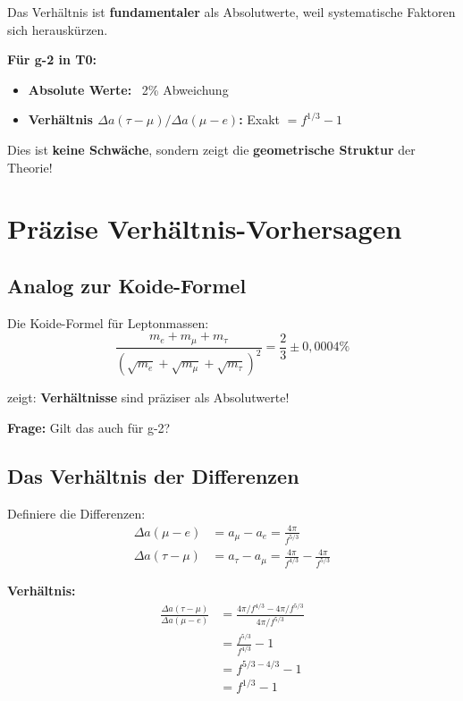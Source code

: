 	Das Verhältnis ist \textbf{fundamentaler} als Absolutwerte, weil systematische Faktoren sich herauskürzen.
	
	\textbf{Für g-2 in T0:}
	\begin{itemize}
		\item \textbf{Absolute Werte:} ~2\% Abweichung
		\item \textbf{Verhältnis $\Delta a(\tau-\mu)/\Delta a(\mu-e)$:} Exakt $= f^{1/3} - 1$
	\end{itemize}
	
	Dies ist \textbf{keine Schwäche}, sondern zeigt die \textbf{geometrische Struktur} der Theorie!	
	\section{Präzise Verhältnis-Vorhersagen}
	
	\subsection{Analog zur Koide-Formel}
	
	Die Koide-Formel für Leptonmassen:
	\begin{equation}
		\frac{m_e + m_\mu + m_\tau}{(\sqrt{m_e} + \sqrt{m_\mu} + \sqrt{m_\tau})^2} = \frac{2}{3} \pm 0{,}0004\%
	\end{equation}
	
	zeigt: \textbf{Verhältnisse} sind präziser als Absolutwerte!
	
	\textbf{Frage:} Gilt das auch für g-2?
	
	\subsection{Das Verhältnis der Differenzen}
	
	Definiere die Differenzen:
	\begin{align}
		\Delta a(\mu - e) &= a_\mu - a_e = \frac{4\pi}{f^{5/3}} \\
		\Delta a(\tau - \mu) &= a_\tau - a_\mu = \frac{4\pi}{f^{4/3}} - \frac{4\pi}{f^{5/3}}
	\end{align}
	
	\textbf{Verhältnis:}
	\begin{align}
		\frac{\Delta a(\tau - \mu)}{\Delta a(\mu - e)} &= \frac{4\pi/f^{4/3} - 4\pi/f^{5/3}}{4\pi/f^{5/3}} \\
		&= \frac{f^{5/3}}{f^{4/3}} - 1 \\
		&= f^{5/3 - 4/3} - 1 \\
		&= f^{1/3} - 1
		\label{eq:ratio}
	\end{align}
	
